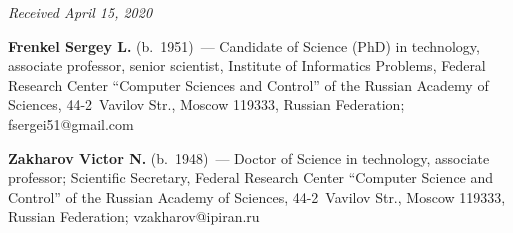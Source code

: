 \hfill{\small\textit{Received April 15, 2020}}




\Contr

\noindent
\textbf{Frenkel Sergey L.} (b.\ 1951)~--- Candidate of Science (PhD) in technology, associate 
professor, senior scientist, Institute of Informatics Problems, Federal Research Center 
``Computer Sciences and Control'' of the Russian Academy of Sciences, 44-2~Vavilov Str., 
Moscow 119333, Russian Federation; \mbox{fsergei51@gmail.com}

\vspace*{3pt}

\noindent
\textbf{Zakharov Victor N.} (b.\ 1948)~--- Doctor of Science in technology, associate professor; 
Scientific Secretary, Federal Research Center ``Computer Science and Control'' of the Russian 
Academy of Sciences,  
44-2~Vavilov Str., Moscow 119333, Russian Federation; \mbox{vzakharov@ipiran.ru}

\label{end\stat}

\renewcommand{\bibname}{\protect\rm Литература} 